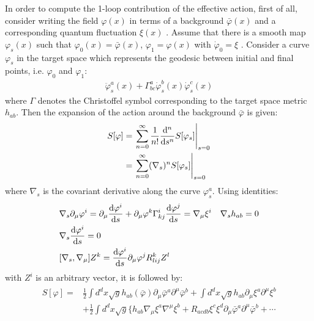 \indent In order to compute the 1-loop contribution of the effective action, first of all, consider writing the field $\varphi (x)$ in terms of a background $\bar {\varphi} (x)$ and a corresponding quantum fluctuation $\xi(x)$ 
\parencite{ketov_all_1996,codello_fixed_2009, flore_functional_2013,friedan_nonlinear_1985,graham_three-loop_1987}. 
Assume that there is a smooth map $\varphi_{s} (x)$ such that $\varphi _{0} (x) = \bar{\varphi}(x)$, $\varphi_{1} = \varphi (x)$ with $\dot{\varphi} _{0} = \xi$ . Consider a curve $\varphi _{s}$ in the target space which represents the geodesic between initial and final points, i.e. $\varphi _{0}$ and $\varphi _{1}$:
\begin{align}
    \ddot{\varphi}_{s} ^{a} (x) + \Gamma _{bc}^{a} \dot{\varphi} _{s}^{b}(x) \dot{\varphi} _{s}^{c} (x)  
\end{align}
where $\Gamma$ denotes the Christoffel symbol corresponding to the target space metric $h_{ab}$. Then the expansion of the action around the background $\bar{\varphi}$ is given:
\begin{align}
    S[\varphi] &=\eval {\sum_{n=0}^{\infty} \frac{1}{n!} \dv[n] {s} S[\varphi _{s}]} _{s=0} \nonumber \\
    & = \eval {\sum_{n=0}^{\infty} (\nabla _{s})^{n} S[\varphi _{s}]} _{s=0}
\end{align}
where $\nabla _{s}$ is the covariant derivative along the curve $\varphi _{s} ^{a}$. Using identities:
\begin{align}
    &\nabla_{s} \partial _{\mu} \varphi ^{i} = \partial _{\mu} \dv{\varphi^{i}}{s} + \partial_{\mu} \varphi ^{k} \Gamma _{kj}^{i} \dv{\varphi^{j}}{s} = \nabla _{\mu} \xi ^{i} 
    & \nabla _{s} h_{ab} = 0 \\
    & \nabla _{s} \dv{\varphi ^{i}} {s} = 0 \\
    &[\nabla _{s}, \nabla _{\mu}] Z^{k} = \dv{\varphi ^{i}}{s} \partial _{\mu} \varphi ^{j} R_{lij} ^{k} Z^{l}
\end{align}
with $Z^{i}$ is an arbitrary vector, it is followed by:
\begin{align}
    \begin{split}
    S[\varphi] = & \frac{1}{2} \int d^{d}x \sqrt{g} h_{ab}(\bar{\varphi}) \partial _{\mu} \bar{\varphi}^{a} \partial ^{\mu} \bar{\varphi} ^{b} + \int d^{d}x \sqrt{g} h_{ab} \partial _{\mu} \xi ^{a} \partial ^{\mu} \xi ^{b} \\
    &+ \frac{1}{2} \int d^{d}x \sqrt{g} \lbrace h_{ab} \nabla_{\mu} \xi^{a} \nabla ^{\mu} \xi ^{b} + R_{acdb} \xi ^{c}\xi^{d} \partial _{\mu}\bar{\varphi}^{a} \partial ^{\mu} \bar{\varphi} ^{b} + \cdots
    \end{split} 
\end{align}
